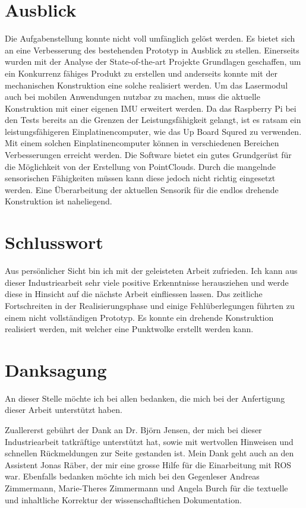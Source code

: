 \section{Ausblick}
\label{sec: Ausblick}
Die Aufgabenstellung konnte nicht voll umfänglich gelöst werden. Es bietet sich an eine Verbesserung des bestehenden Prototyp in Ausblick zu stellen. Einerseits wurden mit der Analyse der State-of-the-art Projekte Grundlagen geschaffen, um ein Konkurrenz fähiges Produkt zu erstellen und anderseits konnte mit der mechanischen Konstruktion eine solche realisiert werden. Um das Lasermodul auch bei mobilen Anwendungen nutzbar zu machen, muss die aktuelle Konstruktion mit einer eigenen IMU erweitert werden. Da das Raspberry Pi bei den Tests bereits an die Grenzen der Leistungsfähigkeit gelangt, ist es ratsam ein leistungsfähigeren Einplatinencomputer, wie das Up Board Squred zu verwenden. Mit einem solchen Einplatinencomputer können in verschiedenen Bereichen Verbesserungen erreicht werden. Die Software bietet ein gutes Grundgerüst für die Möglichkeit von der Erstellung von PointClouds. Durch die mangelnde sensorischen Fähigkeiten müssen kann diese jedoch nicht richtig eingesetzt werden. Eine Überarbeitung der aktuellen Sensorik für die endlos drehende Konstruktion ist naheliegend.

\section{Schlusswort}
Aus persönlicher Sicht bin ich mit der geleisteten Arbeit zufrieden. Ich kann aus dieser Industriearbeit sehr viele positive Erkenntnisse herausziehen und werde diese in Hinsicht auf die nächste Arbeit einfliessen lassen. Das zeitliche Fortschreiten in der Realisierungsphase und einige Fehlüberlegungen führten zu einem nicht vollständigen Prototyp. Es konnte ein drehende Konstruktion realisiert werden, mit welcher eine Punktwolke erstellt werden kann.  

\section{Danksagung}
An dieser Stelle möchte ich bei allen bedanken, die mich bei der Anfertigung dieser Arbeit unterstützt haben.

Zuallererst gebührt der Dank an Dr. Björn Jensen, der mich bei dieser Industriearbeit tatkräftige unterstützt hat, sowie mit wertvollen Hinweisen und schnellen Rückmeldungen zur Seite gestanden ist.
Mein Dank geht auch an den Assistent Jonas Räber, der mir eine grosse Hilfe für die Einarbeitung mit \ac{ROS} war. Ebenfalls bedanken möchte ich mich bei den Gegenleser Andreas Zimmermann, Marie-Theres Zimmermann und Angela Burch für die textuelle und inhaltliche Korrektur der wissenschafltichen Dokumentation.

